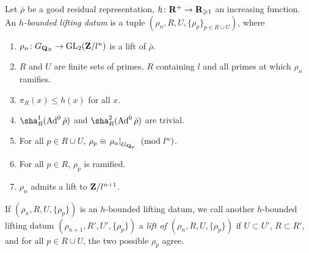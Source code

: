 \begin{definition}
Let $\bar\rho$ be a good residual representation, 
$h\colon \mathbf{R}^+ \to \mathbf{R}_{\geqslant 1}$ an 
increasing function. An \emph{$h$-bounded lifting datum} is a tuple 
$(\rho_n,R,U,\{\rho_p\}_{p\in R\cup U})$, where 
\begin{enumerate}
\item
$\rho_n\colon G_{\mathbf{Q}_R} \to \operatorname{GL}_2(\mathbf{Z}/l^n)$ is a lift of $\bar\rho$.

\item
$R$ and $U$ are finite sets of primes, $R$ containing $l$ and all primes at 
which $\rho_n$ ramifies. 

\item
$\pi_R(x)\leqslant h(x)$ for all $x$. 

\item
$\sha_R^1(\Ad^0\bar\rho)$ and $\sha_R^2(\Ad^0\bar\rho)$ are trivial. 

\item
For all $p\in R\cup U$, 
$\rho_p\equiv \left. \rho_n\right|_{G_{\mathbf{Q}_p}}\pmod{l^n}$. 

\item
For all $p\in R$, $\rho_p$ is ramified. 

\item
$\rho_n$ admits a lift to $\mathbf{Z}/l^{n+1}$. 
\end{enumerate}
\end{definition}

If $(\rho_n,R,U,\{\rho_p\})$ is an $h$-bounded lifting datum, we call 
another $h$-bounded lifting datum $(\rho_{n+1},R',U',\{\rho_p\})$ a \emph{lift 
of $(\rho_n,R,U,\{\rho_p\})$} if $U\subset U'$, $R\subset R'$, and for all 
$p\in R\cup U$, the two possible $\rho_p$ agree. 


